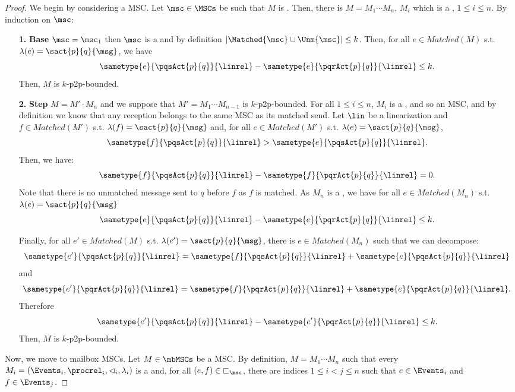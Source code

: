 \begin{proof}
We begin by considering a \pp MSC.
	Let $\msc \in \MSCs$ be such that $M$ is . Then, there is $M = M_1 \cdots M_n$, $M_i$ which is a , $1 \le i \le n$.
	By induction on $\msc$:
	\begin{itemize}
		\item[\textbf{1.}]\textbf{Base} $\msc = \msc_1$ then $\msc$ is a  and by definition $|\Matched{\msc} \cup \Unm{\msc}| \leq k$.
		Then,  for all $e \in Matched(M)$ s.t. $\lambda(e) = \sact{p}{q}{\msg}$, we have
		\[\sametype{e}{\pqsAct{p}{q}}{\linrel} - \sametype{e}{\pqrAct{p}{q}}{\linrel} \le k.\]
		Then, $M$ is $k$-p2p-bounded.
		\item[\textbf{2.}]\textbf{Step}
		$M = M' \cdot M_n$ and we suppose that $M' = M_1 \cdots M_{n-1}$ is $k$-p2p-bounded.
		For all $1\leq i\leq {n}$, $M_i$ is a , and so an MSC, and by definition we know that any reception belongs to the same MSC as its matched send.
		Let $\lin$ be a linearization and $f \in Matched(M')$ s.t. $\lambda(f) = \sact{p}{q}{\msg}$ and, for all $e \in Matched(M')$ s.t. $\lambda(e) = \sact{p}{q}{\msg}$,  \[\sametype{f}{\pqsAct{p}{q}}{\linrel} > \sametype{e}{\pqsAct{p}{q}}{\linrel}.\]
		Then, we have:
		\[\sametype{f}{\pqsAct{p}{q}}{\linrel} - \sametype{f}{\pqrAct{p}{q}}{\linrel} = 0.\]
		Note that there is no unmatched message sent to $q$ before $f$ as $f$ is matched.
		As $M_n$ is a , we have for all  $e \in Matched(M_n)$ s.t. $\lambda(e) = \sact{p}{q}{\msg}$
		\[\sametype{e}{\pqsAct{p}{q}}{\linrel} - \sametype{e}{\pqrAct{p}{q}}{\linrel} \le k.\]

		Finally, for all  $e' \in Matched(M)$ s.t. $\lambda(e') = \sact{p}{q}{\msg}$, there is $e \in Matched(M_n)$ such that we can decompose:
		\[\sametype{e'}{\pqsAct{p}{q}}{\linrel} = \sametype{f}{\pqsAct{p}{q}}{\linrel} + \sametype{e}{\pqsAct{p}{q}}{\linrel} \]
		and
		\[\sametype{e'}{\pqrAct{p}{q}}{\linrel} =  \sametype{f}{\pqrAct{p}{q}}{\linrel} + \sametype{e}{\pqrAct{p}{q}}{\linrel}.\]
		Therefore \[ \sametype{e'}{\pqsAct{p}{q}}{\linrel} - \sametype{e'}{\pqrAct{p}{q}}{\linrel} \le k.\]
		Then, $M$ is $k$-p2p-bounded.
	\end{itemize}

Now, we move to  mailbox MSCs.
		Let $M \in \mbMSCs$ be a  MSC.
	By definition, $M = M_1 \cdots M_n$ such that every $M_i=(\Events_i,\procrel_i,\lhd_i,\lambda_i)$ is a  and, for all $(e,f) \in {\sqsubset}_\msc$, there are indices $1 \leq i < j \leq n$ such that $e \in \Events_i$ and $f \in \Events_j$.


\end{proof}
